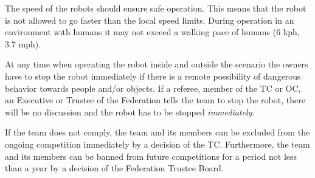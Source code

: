 The speed of the robots should ensure safe operation. This means that the robot is not allowed to go faster than the local speed limits. During operation in an environment with humans it may not exceed a walking pace of humans (6 kph, 3.7 mph). 

At any time when operating the robot inside and outside the scenario the owners have to stop the robot immediately if there is a remote possibility of dangerous behavior towards people and/or objects. If a referee, member of the TC or OC, an Executive or Trustee of the \RC Federation tells the team to stop the robot, there will be no discussion and the robot has to be stopped \emph{immediately}.

If the team does not comply, the team and its members can be excluded from the ongoing competition immediately by a decision of the TC. Furthermore, the team and its members can be banned from future competitions for a period not less than a year by a decision of the \RC Federation Trustee Board.

